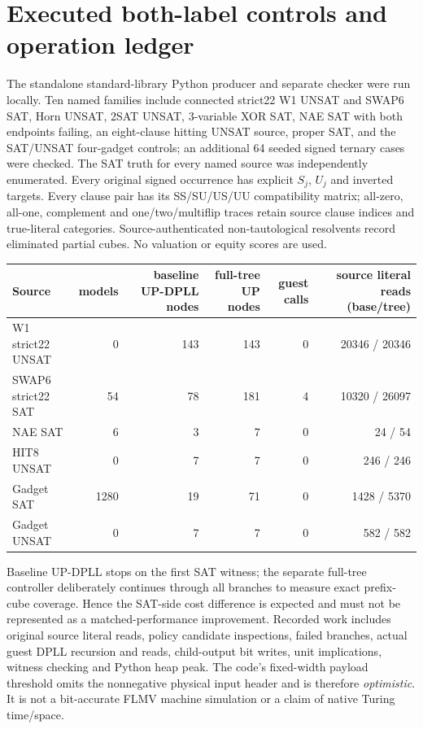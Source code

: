 \documentclass[11pt]{article}
\begin{document}
\section{Executed both-label controls and operation ledger}
The standalone standard-library Python producer and separate checker were
run locally. Ten named families include connected strict22 W1 UNSAT and
SWAP6 SAT, Horn UNSAT, 2SAT UNSAT, 3-variable XOR SAT, NAE SAT with both
endpoints failing, an eight-clause hitting UNSAT source, proper SAT, and
the SAT/UNSAT four-gadget controls; an additional 64 seeded signed ternary
cases were checked. The SAT truth for every named source was independently
enumerated. Every original signed occurrence has explicit $S_j$, $U_j$ and
inverted targets. Every clause pair has its SS/SU/US/UU compatibility matrix;
all-zero, all-one, complement and one/two/multiflip traces retain source
clause indices and true-literal categories. Source-authenticated non-tautological
resolvents record eliminated partial cubes. No valuation or equity scores are used.

\begin{center}\begin{tabular}{lrrrrr}
\toprule
Source & models & baseline UP-DPLL nodes & full-tree UP nodes & guest calls & source literal reads (base/tree)\\
\midrule
W1 strict22 UNSAT & 0 & 143 & 143 & 0 & 20346 / 20346\\
SWAP6 strict22 SAT & 54 & 78 & 181 & 4 & 10320 / 26097\\
NAE SAT & 6 & 3 & 7 & 0 & 24 / 54\\
HIT8 UNSAT & 0 & 7 & 7 & 0 & 246 / 246\\
Gadget SAT & 1280 & 19 & 71 & 0 & 1428 / 5370\\
Gadget UNSAT & 0 & 7 & 7 & 0 & 582 / 582\\
\bottomrule
\end{tabular}\end{center}
Baseline UP-DPLL stops on the first SAT witness; the separate full-tree
controller deliberately continues through all branches to measure exact
prefix-cube coverage. Hence the SAT-side cost difference is expected and
must not be represented as a matched-performance improvement. Recorded work
includes original source literal reads, policy candidate inspections, failed
branches, actual guest DPLL recursion and reads, child-output bit writes,
unit implications, witness checking and Python heap peak. The code's
fixed-width payload threshold omits the nonnegative physical input header
and is therefore \emph{optimistic}. It is not a bit-accurate FLMV machine
simulation or a claim of native Turing time/space.
\end{document}
